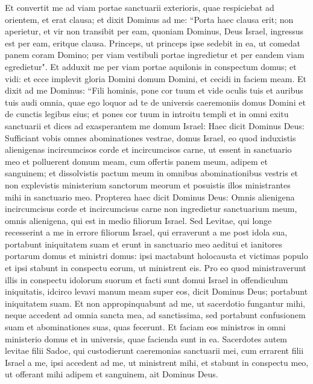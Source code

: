 \begin{biblechapter}  
\verse Et convertit me ad viam portae sanctuarii exterioris, quae respiciebat ad orientem, et erat clausa; 
\verse et dixit Dominus ad me: “Porta haec clausa erit; non aperietur, et vir non transibit per eam, quoniam Dominus, Deus Israel, ingressus est per eam, eritque clausa. 
\verse Princeps, ut princeps ipse sedebit in ea, ut comedat panem coram Domino; per viam vestibuli portae ingredietur et per eandem viam egredietur". 
\verse Et adduxit me per viam portae aquilonis in conspectum domus; et vidi: et ecce implevit gloria Domini domum Domini, et cecidi in faciem meam. 
\verse Et dixit ad me Dominus: “Fili hominis, pone cor tuum et vide oculis tuis et auribus tuis audi omnia, quae ego loquor ad te de universis caeremoniis domus Domini et de cunctis legibus eius; et pones cor tuum in introitu templi et in omni exitu sanctuarii 
\verse et dices ad exasperantem me domum Israel: Haec dicit Dominus Deus: Sufficiant vobis omnes abominationes vestrae, domus Israel, 
\verse eo quod induxistis alienigenas incircumcisos corde et incircumcisos carne, ut essent in sanctuario meo et polluerent domum meam, cum offertis panem meum, adipem et sanguinem; et dissolvistis pactum meum in omnibus abominationibus vestris 
\verse et non explevistis ministerium sanctorum meorum et posuistis illos ministrantes mihi in sanctuario meo. Propterea 
\verse haec dicit Dominus Deus: Omnis alienigena incircumcisus corde et incircumcisus carne non ingredietur sanctuarium meum, omnis alienigena, qui est in medio filiorum Israel. 
\verse Sed Levitae, qui longe recesserint a me in errore filiorum Israel, qui erraverunt a me post idola sua, portabunt iniquitatem suam 
\verse et erunt in sanctuario meo aeditui et ianitores portarum domus et ministri domus: ipsi mactabunt holocausta et victimas populo et ipsi stabunt in conspectu eorum, ut ministrent eis. 
\verse Pro eo quod ministraverunt illis in conspectu idolorum suorum et facti sunt domui Israel in offendiculum iniquitatis, idcirco levavi manum meam super eos, dicit Dominus Deus; portabunt iniquitatem suam. 
\verse Et non appropinquabunt ad me, ut sacerdotio fungantur mihi, neque accedent ad omnia sancta mea, ad sanctissima, sed portabunt confusionem suam et abominationes suas, quas fecerunt. 
\verse Et faciam eos ministros in omni ministerio domus et in universis, quae facienda sunt in ea. 
\verse Sacerdotes autem levitae filii Sadoc, qui custodierunt caeremonias sanctuarii mei, cum errarent filii Israel a me, ipsi accedent ad me, ut ministrent mihi, et stabunt in conspectu meo, ut offerant mihi adipem et sanguinem, ait Dominus Deus. 

\end{biblechapter}
